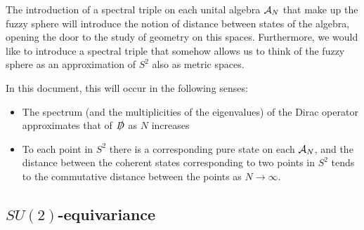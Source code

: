The introduction of a spectral triple on each unital algebra $\mathcal A_N$ that make up the fuzzy sphere will introduce the notion of distance between states of the algebra, opening the door to the study of geometry on this spaces. Furthermore, we would like to introduce a spectral triple that somehow allows us to think of the fuzzy sphere as an approximation of $S^2$ also as metric spaces. 

In this document, this will occur in the following senses:

    \begin{itemize}
    
    \item The spectrum (and the multiplicities of the eigenvalues) of the Dirac operator approximates that of $\slashed D$ as $N$ increases
    
    \item To each point in $S^2$ there is a corresponding pure state on each $\mathcal A_N$, and the distance between the coherent states corresponding to two points in $S^2$ tends to the commutative distance between the points as $N \to \infty$.
    
    \end{itemize}

\subsection{$SU(2)$-equivariance}





